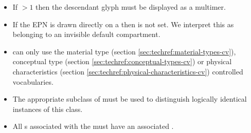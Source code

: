\begin{itemize}
\item If  $>1$ then the descendant glyph must be displayed
  as a multimer.
\item If the EPN is drawn directly on a  then
   is not set. We interpret this as
  belonging to an invisible default compartment.
 \item {} can only use the material type (section
 \ref{sec:techref:material-types-cv}), conceptual type (section \ref{sec:techref:conceptual-types-cv}) or physical
 characteristics (section \ref{sec:techref:physical-characteristics-cv}) controlled vocabularies.
\item The appropriate subclass of  must be used
  to distinguish logically identical instances of this class.
\item All s associated with the
   must have an associated
  .
\end{itemize}





